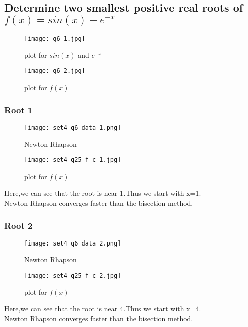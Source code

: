 \documentclass[a4paper]{article}
\begin{document}
        \subsection{Determine two smallest positive real roots of $f(x)=sin(x)-e^{-x}$}
            \begin{figure}[!htbp]
              \centering
              \begin{minipage}[b]{0.45\textwidth}
                \texttt{[image: q6\_1.jpg]}
                \caption{plot for $sin(x)$ and $e^{-x}$}
              \end{minipage}
              \hfill
              \begin{minipage}[b]{0.45\textwidth}
                \texttt{[image: q6\_2.jpg]}
                \caption{plot for $f(x)$ }
              \end{minipage}
            \end{figure}
        \subsubsection{Root 1}
            \begin{figure}[!htbp]
              \centering
              \begin{minipage}[b]{0.45\textwidth}
\texttt{[image: set4\_q6\_data\_1.png]}
                \caption{Newton Rhapson }
              \end{minipage}
              \hfill
              \begin{minipage}[b]{0.45\textwidth}
                \texttt{[image: set4\_q25\_f\_c\_1.jpg]}
                \caption{plot for $f(x)$}
              \end{minipage}
            \end{figure}
            \Large{Here,we can see that the root is near 1.Thus we start with x=1.\\Newton Rhapson converges faster than the bisection method.}
            \newpage
            \subsubsection{Root 2}
             \begin{figure}[!htbp]
              \centering
              \begin{minipage}[b]{0.45\textwidth}
\texttt{[image: set4\_q6\_data\_2.png]}
                \caption{Newton Rhapson }
              \end{minipage}
              \hfill
              \begin{minipage}[b]{0.45\textwidth}
                \texttt{[image: set4\_q25\_f\_c\_2.jpg]}
                \caption{plot for $f(x)$}
              \end{minipage}
            \end{figure}
            \Large{Here,we can see that the root is near 4.Thus we start with x=4.\\Newton Rhapson converges faster than the bisection method.}
        \newpage
        
\end{document}
